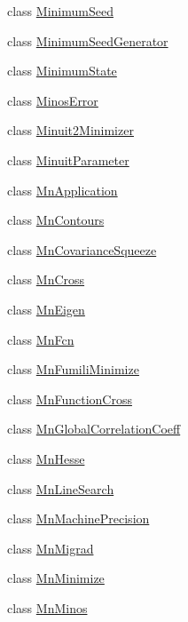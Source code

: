 \begin{DoxyCompactItemize}
\item 
class \mbox{\hyperlink{classROOT_1_1Minuit2_1_1MinimumSeed}{Minimum\+Seed}}
\item 
class \mbox{\hyperlink{classROOT_1_1Minuit2_1_1MinimumSeedGenerator}{Minimum\+Seed\+Generator}}
\item 
class \mbox{\hyperlink{classROOT_1_1Minuit2_1_1MinimumState}{Minimum\+State}}
\item 
class \mbox{\hyperlink{classROOT_1_1Minuit2_1_1MinosError}{Minos\+Error}}
\item 
class \mbox{\hyperlink{classROOT_1_1Minuit2_1_1Minuit2Minimizer}{Minuit2\+Minimizer}}
\item 
class \mbox{\hyperlink{classROOT_1_1Minuit2_1_1MinuitParameter}{Minuit\+Parameter}}
\item 
class \mbox{\hyperlink{classROOT_1_1Minuit2_1_1MnApplication}{Mn\+Application}}
\item 
class \mbox{\hyperlink{classROOT_1_1Minuit2_1_1MnContours}{Mn\+Contours}}
\item 
class \mbox{\hyperlink{classROOT_1_1Minuit2_1_1MnCovarianceSqueeze}{Mn\+Covariance\+Squeeze}}
\item 
class \mbox{\hyperlink{classROOT_1_1Minuit2_1_1MnCross}{Mn\+Cross}}
\item 
class \mbox{\hyperlink{classROOT_1_1Minuit2_1_1MnEigen}{Mn\+Eigen}}
\item 
class \mbox{\hyperlink{classROOT_1_1Minuit2_1_1MnFcn}{Mn\+Fcn}}
\item 
class \mbox{\hyperlink{classROOT_1_1Minuit2_1_1MnFumiliMinimize}{Mn\+Fumili\+Minimize}}
\item 
class \mbox{\hyperlink{classROOT_1_1Minuit2_1_1MnFunctionCross}{Mn\+Function\+Cross}}
\item 
class \mbox{\hyperlink{classROOT_1_1Minuit2_1_1MnGlobalCorrelationCoeff}{Mn\+Global\+Correlation\+Coeff}}
\item 
class \mbox{\hyperlink{classROOT_1_1Minuit2_1_1MnHesse}{Mn\+Hesse}}
\item 
class \mbox{\hyperlink{classROOT_1_1Minuit2_1_1MnLineSearch}{Mn\+Line\+Search}}
\item 
class \mbox{\hyperlink{classROOT_1_1Minuit2_1_1MnMachinePrecision}{Mn\+Machine\+Precision}}
\item 
class \mbox{\hyperlink{classROOT_1_1Minuit2_1_1MnMigrad}{Mn\+Migrad}}
\item 
class \mbox{\hyperlink{classROOT_1_1Minuit2_1_1MnMinimize}{Mn\+Minimize}}
\item 
class \mbox{\hyperlink{classROOT_1_1Minuit2_1_1MnMinos}{Mn\+Minos}}

\end{DoxyCompactItemize}

